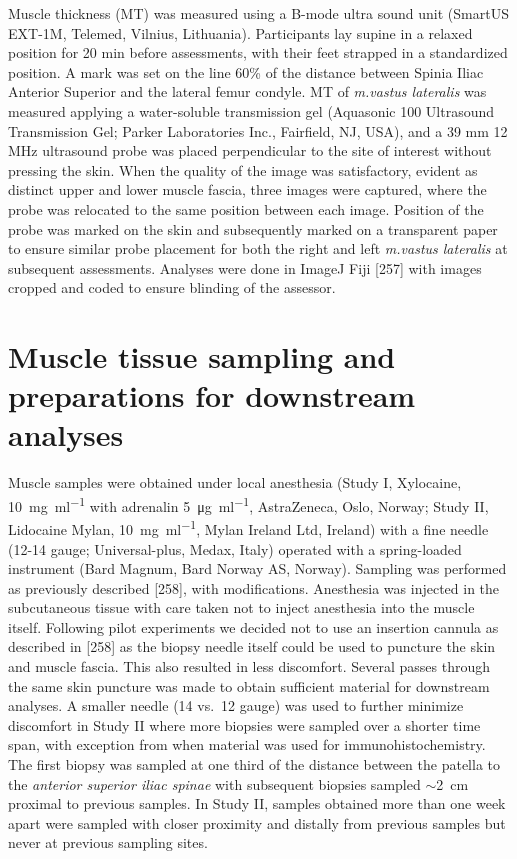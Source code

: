 \documentclass[twoside,10pt]{gihclass} %
\begin{document}
Muscle thickness (MT) was measured using a B-mode ultra sound unit (SmartUS EXT-1M, Telemed, Vilnius, Lithuania). Participants lay supine in a relaxed position for 20 min before assessments, with their feet strapped in a standardized position. A mark was set on the line 60\% of the distance between Spinia Iliac Anterior Superior and the lateral femur condyle. MT of \emph{m.vastus lateralis} was measured applying a water-soluble transmission gel (Aquasonic 100 Ultrasound Transmission Gel; Parker Laboratories Inc., Fairfield, NJ, USA), and a 39 mm 12 MHz ultrasound probe was placed perpendicular to the site of interest without pressing the skin. When the quality of the image was satisfactory, evident as distinct upper and lower muscle fascia, three images were captured, where the probe was relocated to the same position between each image. Position of the probe was marked on the skin and subsequently marked on a transparent paper to ensure similar probe placement for both the right and left \emph{m.vastus lateralis} at subsequent assessments. Analyses were done in ImageJ Fiji {[}257{]} with images cropped and coded to ensure blinding of the assessor.

\hypertarget{muscle-tissue-sampling-and-preparations-for-downstream-analyses}{%
\section{Muscle tissue sampling and preparations for downstream analyses}\label{muscle-tissue-sampling-and-preparations-for-downstream-analyses}}

Muscle samples were obtained under local anesthesia (Study I, Xylocaine,
\SI{10}{\mg\per\ml} with adrenalin \SI{5}{\micro\gram\per\ml},
AstraZeneca, Oslo, Norway; Study II, Lidocaine Mylan,
\SI{10}{\mg\per\ml}, Mylan Ireland Ltd, Ireland) with a fine needle
(12-14 gauge; Universal-plus, Medax, Italy) operated with a
spring-loaded instrument (Bard Magnum, Bard Norway AS, Norway). Sampling
was performed as previously described
{[}258{]}, with
modifications. Anesthesia was injected in the subcutaneous tissue with
care taken not to inject anesthesia into the muscle itself. Following
pilot experiments we decided not to use an insertion cannula as
described in {[}258{]} as the biopsy needle itself could be used to
puncture the skin and muscle fascia. This also resulted in less
discomfort. Several passes through the same skin puncture was made to
obtain sufficient material for downstream analyses. A smaller needle (14
vs.~12 gauge) was used to further minimize discomfort in Study II where
more biopsies were sampled over a shorter time span, with exception from
when material was used for immunohistochemistry. The first biopsy was
sampled at one third of the distance between the patella to the
\emph{anterior superior iliac spinae} with subsequent biopsies sampled
\(\sim\)\SI{2}{cm} proximal to previous samples. In Study II, samples
obtained more than one week apart were sampled with closer proximity and
distally from previous samples but never at previous sampling sites.
\end{document}
